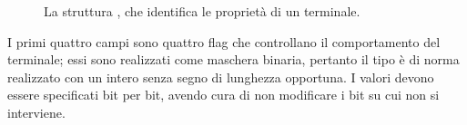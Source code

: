 \begin{figure}[!htb] 
  \footnotesize \centering
  \begin{minipage}[c]{0.80\textwidth}
  \end{minipage} 
  \normalsize 
  \caption{La struttura , che identifica le proprietà di un
    terminale.}
  \label{fig:term_termios}
\end{figure}


I primi quattro campi sono quattro flag che controllano il comportamento del
terminale; essi sono realizzati come maschera binaria, pertanto il tipo
 è di norma realizzato con un intero senza segno di lunghezza
opportuna. I valori devono essere specificati bit per bit, avendo cura di non
modificare i bit su cui non si interviene.


